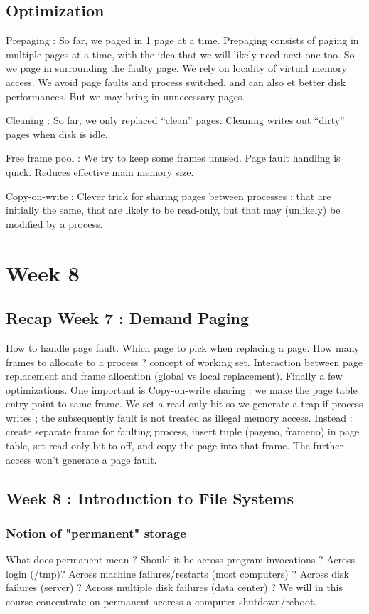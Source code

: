 \documentclass[12pt,a4paper]{article}
\begin{document}
\subsection{Optimization}
Prepaging : So far, we paged in 1 page at a time. Prepaging consists of paging in multiple pages at a time, with the idea that we will likely need next one too. So we page in surrounding the faulty page. We rely on locality of virtual memory access. We avoid page faults and process switched, and can also et better disk performances. But we may bring in unnecessary pages. 

Cleaning : So far, we only replaced ``clean'' pages. Cleaning writes out ``dirty'' pages when disk is idle. 

Free frame pool : We try to keep some frames unused. Page fault handling is quick. Reduces effective main memory size. 

Copy-on-write : Clever trick for sharing pages between processes : that are initially the same, that are likely to be read-only, but that may (unlikely) be modified by a process. 

\section{Week 8}
\subsection{Recap Week 7 : Demand Paging}
How to handle page fault. Which page to pick when replacing a page. How many frames to allocate to a process ? concept of working set. Interaction between page replacement and frame allocation (global vs local replacement). Finally a few optimizations. One important is Copy-on-write sharing : we make the page table entry point to same frame. We set a read-only bit so we generate a trap if process writes ; the subsequently fault is not treated as illegal memory access. Instead : create separate frame for faulting process, insert tuple (pageno, frameno) in page table, set read-only bit to off, and copy the page into that frame. The further access won't generate a page fault.

\subsection{Week 8 : Introduction to File Systems}
\subsubsection{Notion of "permanent" storage}
What does permanent mean ? Should it be across program invocations ? Across login (/tmp)? Across machine failures/restarts (most computers) ? Across disk failures (server) ? Across multiple disk failures (data center) ? We will in this course concentrate on permanent accress a computer shutdown/reboot. 
\end{document}
